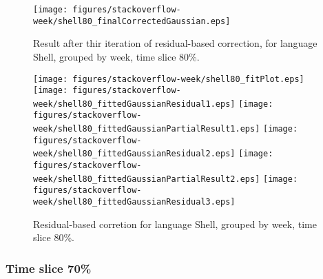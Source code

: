 \begin{figure}[]
\centering
{\texttt{[image: figures/stackoverflow-week/shell80\_finalCorrectedGaussian.eps]}}
\caption{Result after thir iteration of residual-based correction, for language Shell, grouped by week, time slice 80\%.}
\end{figure}


\begin{figure}[hb]
\centering
{}
{\texttt{[image: figures/stackoverflow-week/shell80\_fitPlot.eps]}}
{\texttt{[image: figures/stackoverflow-week/shell80\_fittedGaussianResidual1.eps]}}
{\texttt{[image: figures/stackoverflow-week/shell80\_fittedGaussianPartialResult1.eps]}}
{\texttt{[image: figures/stackoverflow-week/shell80\_fittedGaussianResidual2.eps]}}
{\texttt{[image: figures/stackoverflow-week/shell80\_fittedGaussianPartialResult2.eps]}}
{\texttt{[image: figures/stackoverflow-week/shell80\_fittedGaussianResidual3.eps]}}
\caption{Residual-based corretion for language Shell, grouped by week, time slice 80\%.}
\end{figure}


\clearpage 
\newpage 


\FloatBarrier

\subsubsection{Time slice 70\%}

